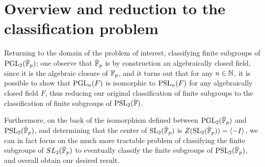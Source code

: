 








\section{Overview and reduction to the classification problem}

Returning to the domain of the problem of interest, classifying finite subgroups of $\operatorname{PGL}_2(\bar{\mathbb{F}}_p)$; one observe that $\bar{\mathbb{F}}_p$ is by construction an algebraically closed field, since it is the algebraic closure of $\mathbb{F}_p$,
and it turns out that for any $n \in \mathbb{N}$, it is possible to show that $\operatorname{PGL}_n(F)$ is isomorphic to $\operatorname{PSL}_n(F)$ for any algebraically closed field $F$, thus reducing our original classification of finite subgroups to the classification of finite subgroups of $\operatorname{PSL}_2(\bar{\mathbb{F}})$.

Furthermore, on the back of the isomorphism defined between $\operatorname{PGL}_2(\bar{\mathbb{F}}_p)$ and $\operatorname{PSL}_2(\bar{\mathbb{F}}_p)$, and determining that the center of $\operatorname{SL}_2(\bar{\mathbb{F}}_p)$ is $Z(\operatorname{SL}_2(\bar{\mathbb{F}}_p)) = \langle -I\rangle$, we can in fact focus on the much more tractable problem of 
classifying the finite subgroups of $SL_2(\bar{\mathbb{F}}_p)$ to eventually classify the finite subgroups of $\operatorname{PSL}_2(\bar{\mathbb{F}}_p)$, and overall obtain our desired result. 

